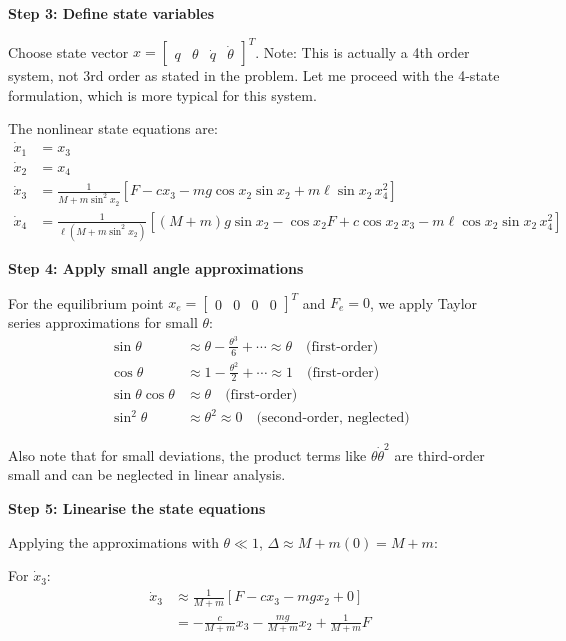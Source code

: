 \documentclass[11pt,a4paper]{article}
\begin{document}
\textbf{Step 3: Define state variables}

Choose state vector $x = \begin{bmatrix} q & \theta & \dot{q} & \dot{\theta} \end{bmatrix}^T$. Note: This is actually a 4th order system, not 3rd order as stated in the problem. Let me proceed with the 4-state formulation, which is more typical for this system.

The nonlinear state equations are:
\begin{align}
\dot{x}_1 &= x_3\\
\dot{x}_2 &= x_4\\
\dot{x}_3 &= \frac{1}{M + m\sin^2 x_2}\left[F - c x_3 - mg\cos x_2\sin x_2 + m\ell\sin x_2\,x_4^2\right]\\
\dot{x}_4 &= \frac{1}{\ell(M+m\sin^2 x_2)}\left[(M+m)g\sin x_2 - \cos x_2 F + c\cos x_2\,x_3 - m\ell\cos x_2\sin x_2\,x_4^2\right]
\end{align}

\textbf{Step 4: Apply small angle approximations}

For the equilibrium point $x_e = \begin{bmatrix} 0 & 0 & 0 & 0 \end{bmatrix}^T$ and $F_e = 0$, we apply Taylor series approximations for small $\theta$:
\begin{align}
\sin\theta &\approx \theta - \frac{\theta^3}{6} + \cdots \approx \theta \quad \text{(first-order)}\\
\cos\theta &\approx 1 - \frac{\theta^2}{2} + \cdots \approx 1 \quad \text{(first-order)}\\
\sin\theta\cos\theta &\approx \theta \quad \text{(first-order)}\\
\sin^2\theta &\approx \theta^2 \approx 0 \quad \text{(second-order, neglected)}
\end{align}

Also note that for small deviations, the product terms like $\theta\dot{\theta}^2$ are third-order small and can be neglected in linear analysis.

\textbf{Step 5: Linearise the state equations}

Applying the approximations with $\theta \ll 1$, $\Delta \approx M + m(0) = M + m$:

For $\dot{x}_3$:
\begin{align}
\dot{x}_3 &\approx \frac{1}{M+m}\left[F - cx_3 - mgx_2 + 0\right]\\
&= -\frac{c}{M+m}x_3 - \frac{mg}{M+m}x_2 + \frac{1}{M+m}F
\end{align}
\end{document}
